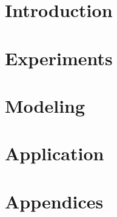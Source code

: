 \documentclass[11pt, openright, titlepage, table, twoside]{book}
\begin{document}
\maketitle




\part{Introduction}
\label{part:introduction}




\part{Experiments}
\label{part:experiments}





\part{Modeling}
\label{part:modeling}




\part{Application}
\label{part:application}







\newrefcontext[sorting=nyt] %
\printbibliography[heading=bibintoc, title={Bibliography}]


\appendix

\renewcommand{\thesection}{\Roman{section}} 
\renewcommand{\thesubsection}{\thesection.\Roman{subsection}}

\part{Appendices}
\label{part:appendices}





\end{document}

